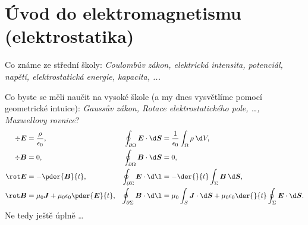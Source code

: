\documentclass[11pt,a4paper]{report}
\renewcommand{\vec}{\boldsymbol}
\begin{document}
	
	
	\section*{Úvod do elektromagnetismu (elektrostatika)}
	
	Co známe ze střední školy: \textit{Coulombův zákon, elektrická intensita, potenciál, napětí, elektrostatická energie, kapacita, ...}
	
	Co byste se měli naučit na vysoké škole (a my dnes vysvětlíme pomocí geometrické intuice): \textit{Gaussův zákon, Rotace elektrostatického pole, \dots, Maxwellovy rovnice}?
	\begin{align}
		\div \vec E &= \frac{\rho}{\epsilon_0}, & \oint_{\partial \Omega} \vec E \cdot \d \vec S &= \frac{1}{\epsilon_0} \int_{\Omega} \rho \: \d V,
	\\
		\div \vec B &= 0, & \oint_{\partial \Omega} \vec B \cdot \d \vec S &= 0,
	\\
		\rot \vec E &= -\pder{\vec B}{t}, & \oint_{\partial \Sigma} \vec E \cdot \d \vec \l &= -\der{}{t} \int_{\Sigma} \vec B \: \d \vec S,	
	\\
		\label{eq:ampere}
		\rot \vec B &= \mu_0 \vec J + \mu_0 \epsilon_0 \pder{\vec E}{t}, & \oint_{\partial \Sigma} \vec B \cdot \d \vec \l &= \mu_0 \int_S \vec J \cdot \d \vec S  + \mu_0 \epsilon_0 \der{}{t} \oint_{\Sigma} \vec E \cdot \d \vec S.
	\end{align}
	Ne tedy ještě úplně \dots
	
\end{document}
